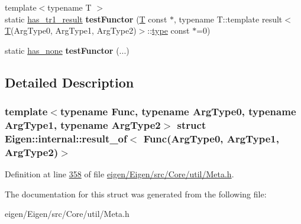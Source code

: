 \begin{DoxyCompactItemize}
\item 
\mbox{\label{struct_eigen_1_1internal_1_1result__of_3_01_func_07_arg_type0_00_01_arg_type1_00_01_arg_type2_08_4_ae02c3ef769fda8c4585f3261306030b7}} 
{\footnotesize template$<$typename T $>$ }\\static \hyperlink{struct_eigen_1_1internal_1_1has__tr1__result}{has\+\_\+tr1\+\_\+result} {\bfseries test\+Functor} (\hyperlink{group___sparse_core___module}{T} const $\ast$, typename T\+::template result$<$ \hyperlink{group___sparse_core___module}{T}(Arg\+Type0, Arg\+Type1, Arg\+Type2)$>$\+::\hyperlink{group___sparse_core___module}{type} const $\ast$=0)
\item 
\mbox{\label{struct_eigen_1_1internal_1_1result__of_3_01_func_07_arg_type0_00_01_arg_type1_00_01_arg_type2_08_4_a9ab5bd241cc11f5e5207c107c628fc28}} 
static \hyperlink{struct_eigen_1_1internal_1_1has__none}{has\+\_\+none} {\bfseries test\+Functor} (...)
\end{DoxyCompactItemize}


\subsection{Detailed Description}
\subsubsection*{template$<$typename Func, typename Arg\+Type0, typename Arg\+Type1, typename Arg\+Type2$>$\newline
struct Eigen\+::internal\+::result\+\_\+of$<$ Func(\+Arg\+Type0, Arg\+Type1, Arg\+Type2)$>$}



Definition at line \hyperlink{eigen_2_eigen_2src_2_core_2util_2_meta_8h_source_l00358}{358} of file \hyperlink{eigen_2_eigen_2src_2_core_2util_2_meta_8h_source}{eigen/\+Eigen/src/\+Core/util/\+Meta.\+h}.



The documentation for this struct was generated from the following file\+:\begin{DoxyCompactItemize}
\item 
eigen/\+Eigen/src/\+Core/util/\+Meta.\+h\end{DoxyCompactItemize}
